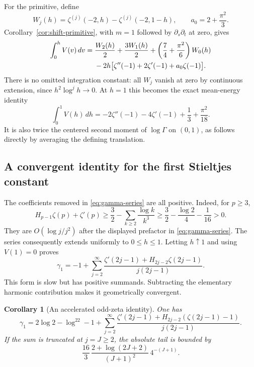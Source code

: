 \documentclass[11pt,a4paper]{article}
\numberwithin{equation}{section}
\newtheorem{corollary}[theorem]{Corollary}
\theoremstyle{definition}
\theoremstyle{remark}
\begin{document}
For the primitive, define
\[
 W_j(h)=\zeta^{(j)}(-2,h)-\zeta^{(j)}(-2,1-h),\qquad
 a_0=2+\frac{\pi^2}{3}.
\]
Corollary~\ref{cor:shift-primitive}, with $m=1$ followed by
$\partial_s\partial_t$ at zero, gives
\begin{align}
 \int_0^h V(v)\,dv={}&\frac{W_2(h)}2+\frac{3W_1(h)}2
            +\left(\frac74+\frac{\pi^2}{6}\right)W_0(h)\notag\\
 &-2h\bigl[\zeta''(-1)+2\zeta'(-1)+a_0\zeta(-1)\bigr].
 \label{eq:V-primitive}
\end{align}
There is no omitted integration constant: all $W_j$ vanish at zero
by continuous extension, since $h^2\log^j h\to0$. At $h=1$ this
becomes the exact mean-energy identity
\begin{equation}\label{eq:V-mean}
 \int_0^1 V(h)\,dh
 =-2\zeta''(-1)-4\zeta'(-1)+\frac13+\frac{\pi^2}{18}.
\end{equation}
It is also twice the centered second moment of $\log\Gamma$ on
$(0,1)$, as follows directly by averaging the defining translation.

\subsection{A convergent identity for the first Stieltjes constant}

The coefficients removed in \eqref{eq:gamma-series} are all positive.
Indeed, for $p\geq3$,
\[
 H_{p-1}\zeta(p)+\zeta'(p)
 \geq\frac32-\sum_{k\geq2}\frac{\log k}{k^3}
 \geq\frac32-\frac{\log2}{4}-\frac1{16}>0.
\]
They are $O(\log j/j^2)$ after the displayed prefactor in
\eqref{eq:gamma-series}. The series consequently extends uniformly to
$0\leq h\leq1$. Letting $h\uparrow1$ and using $V(1)=0$ proves
\begin{equation}\label{eq:gamma1-odd}
 \boxed{\quad
 \gamma_1=-1+\sum_{j=2}^{\infty}
   \frac{\zeta'(2j-1)+H_{2j-2}\zeta(2j-1)}{j(2j-1)}.
 \quad}
\end{equation}
This form is slow but has positive summands. Subtracting the elementary
harmonic contribution makes it geometrically convergent.

\begin{corollary}[An accelerated odd-zeta identity]\label{cor:gamma1-fast}
One has
\begin{equation}\label{eq:gamma1-fast}
 \boxed{\quad
 \gamma_1=2\log2-\log^22-1+
 \sum_{j=2}^{\infty}
 \frac{\zeta'(2j-1)+H_{2j-2}(\zeta(2j-1)-1)}{j(2j-1)}.
 \quad}
\end{equation}
If the sum is truncated at $j=J\geq2$, the absolute tail is bounded by
\begin{equation}\label{eq:gamma1-tail}
 \frac{16}{3}\,
 \frac{2+\log(2J+2)}{(J+1)^2}\,4^{-(J+1)}.
\end{equation}
\end{corollary}
\end{document}
